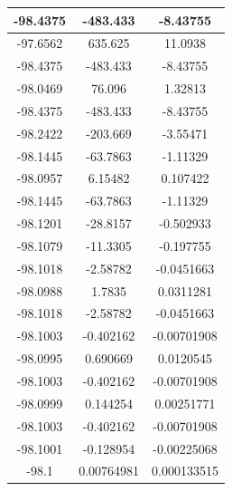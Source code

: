 \documentclass[a4paper,14pt]{extarticle}
\begin{document}
\begin{enumerate}[1. ]
\begin{center}
\begin{longtable}{|c|c|c|}
                  -98.4375 & -483.433     & -8.43755     \\
                  \hline
                  -97.6562 & 635.625      & 11.0938      \\
                  \hline
                  -98.4375 & -483.433     & -8.43755     \\
                  \hline
                  -98.0469 & 76.096       & 1.32813      \\
                  \hline
                  -98.4375 & -483.433     & -8.43755     \\
                  \hline
                  -98.2422 & -203.669     & -3.55471     \\
                  \hline
                  -98.1445 & -63.7863     & -1.11329     \\
                  \hline
                  -98.0957 & 6.15482      & 0.107422     \\
                  \hline
                  -98.1445 & -63.7863     & -1.11329     \\
                  \hline
                  -98.1201 & -28.8157     & -0.502933    \\
                  \hline
                  -98.1079 & -11.3305     & -0.197755    \\
                  \hline
                  -98.1018 & -2.58782     & -0.0451663   \\
                  \hline
                  -98.0988 & 1.7835       & 0.0311281    \\
                  \hline
                  -98.1018 & -2.58782     & -0.0451663   \\
                  \hline
                  -98.1003 & -0.402162    & -0.00701908  \\
                  \hline
                  -98.0995 & 0.690669     & 0.0120545    \\
                  \hline
                  -98.1003 & -0.402162    & -0.00701908  \\
                  \hline
                  -98.0999 & 0.144254     & 0.00251771   \\
                  \hline
                  -98.1003 & -0.402162    & -0.00701908  \\
                  \hline
                  -98.1001 & -0.128954    & -0.00225068  \\
                  \hline
                  -98.1    & 0.00764981   & 0.000133515  \\

\end{longtable}
\end{center}
\end{enumerate}
\end{document}
